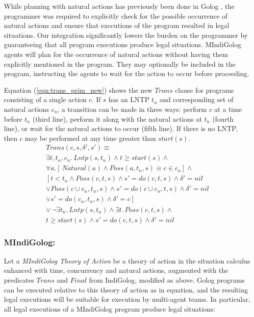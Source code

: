 \documentclass[letterpaper]{article}
\begin{document}
While planning with natural actions has previously been done in Golog
\cite{pirri00planning_nat_acts}, the programmer
was required to explicitly check for the possible occurrence of natural
actions and ensure that executions of the program resulted in legal
situations. Our integration significantly lowers the burden on the
programmer by guaranteeing that all program executions produce legal
situations.
MIndiGolog agents will plan for the occurrence of natural actions
without having them explicitly mentioned in the program.  They may
optionally be included in the program, instructing the agents to wait for
the action to occur before proceeding.

Equation (\ref{eqn:trans_prim_new}) shows the new $Trans$ clause for programs
consisting of a single action $c$.  If $s$ has an LNTP $t_n$ and corresponding
set of natural actions $c_n$, a transition can be made in three ways:
perform $c$ at a time before $t_n$ (third line), perform it along with
the natural actions at $t_n$ (fourth line), or wait for the natural
actions to occur (fifth line).  If there is no LNTP, then $c$ may be
performed at any time greater than $start(s)$.
\begin{multline}
\label{eqn:trans_prim_new}
Trans(c,s,\delta',s')\equiv \\
  \exists t,t_n,c_n.\,Lntp(s,t_n) \wedge t\geq start(s) \wedge\\
      \forall a.\left[\,Natural(a)\wedge Poss(a,t_n,s)\equiv c\in c_n\right]\wedge\\
      \left[ t<t_n\wedge Poss(c,t,s)\wedge s'=do(c,t,s)\wedge \delta'=nil\right.\\
            \vee Poss(c\cup c_n,t_n,s)\wedge s'=do(c\cup c_n,t,s)\wedge \delta'=nil\\
            \vee \left.s'=do(c_n,t_n,s)\wedge \delta'=c\right]\\
  \vee\,\neg\exists t_{n}.\,Lntp(s,t_{n})\wedge\exists t.\,Poss(c,t,s)\wedge\\
  t\geq start(s)\wedge s'=do(c,t,s)\wedge\delta'=nil
\end{multline}

\subsubsection{MIndiGolog:}
Let a \emph{MIndiGolog Theory of Action} be a theory
of action in the situation calculus enhanced with time, concurrency and
natural actions, augmented with the predicates $Trans$ and $Final$ from
IndiGolog, modified as above.
Golog programs can be executed relative to this
theory of action as in equation, and the resulting legal
executions will be suitable for execution by multi-agent teams.
In particular, all legal executions of a MIndiGolog
program produce legal situations:
\end{document}
